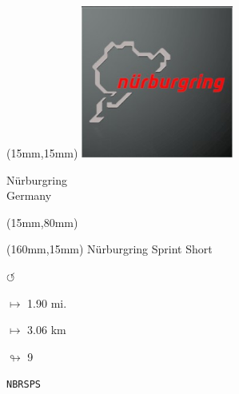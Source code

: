 \begin{textblock*}{50mm}(15mm,15mm)%
\includegraphics[width=50mm]{LG/2015-05-20_00089.png}
\par Nürburgring\\ Germany
\end{textblock*}
\begin{textblock*}{185mm}(15mm,80mm)%
\end{textblock*}
\begin{textblock*}{40mm}(160mm,15mm)%
Nürburgring Sprint Short
\par \Huge$\circlearrowleft$
\Large
\par$\mapsto$ 1.90 mi.
\par$\mapsto$ 3.06 km
\par$\looparrowright$ 9
\par\hfill\tiny\tt NBRSPS\\
\end{textblock*}
\null\newpage

